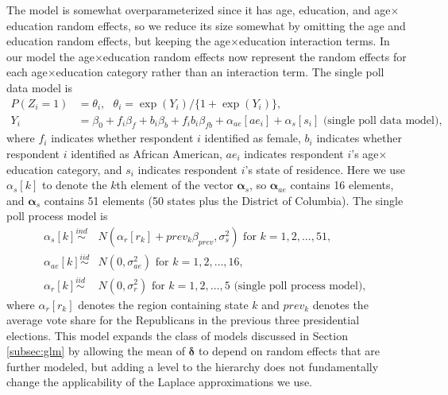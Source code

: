 \documentclass[12pt]{article}
\begin{document}
The model is somewhat overparameterized since it has age, education, and age$\times$education random effects, so we reduce its size somewhat by omitting the age and education random effects, but keeping the age$\times$education interaction terms. In our model the age$\times$education random effects now represent the random effects for each age$\times$education category rather than an interaction term. The single poll data model is
\begin{align*}
P(Z_i = 1) &= \theta_i,\ \ \   \theta_i = \exp(Y_i)/\{1 + \exp(Y_i)\}, \\
Y_i &= \beta_0 + f_i\beta_f + b_i\beta_b + f_ib_i\beta_{fb} + \alpha_{ae}[ae_i] + \alpha_{s}[s_i]\mbox{\ \ \ \ (single poll data model), }
\end{align*}
where $f_i$ indicates whether respondent $i$ identified as female, $b_i$ indicates whether respondent $i$ identified as African American, $ae_i$ indicates respondent $i$'s age$\times$education category, and $s_i$ indicates respondent $i$'s state of residence. Here we use $\alpha_{s}[k]$ to denote the $k$th element of the vector $\bm{\alpha}_s$, so $\bm{\alpha}_{ae}$ contains 16 elements, and $\bm{\alpha}_s$ contains 51 elements (50 states plus the District of Columbia). The single poll process model is
\begin{align*}
\alpha_s[k] \stackrel{ind}{\sim}& N(\alpha_r[r_k] + prev_k\beta_{prev}, \sigma^2_s) \mbox{ for } k=1,2,\dots,51,\\
\alpha_{ae}[k] \stackrel{iid}{\sim}& N(0, \sigma^2_{ae}) \mbox{ for } k=1,2,\dots,16,\\
\alpha_{r}[k] \stackrel{iid}{\sim}& N(0, \sigma^2_{r}) \mbox{ for } k=1,2,\dots,5 \mbox{\ \ \ \ (single poll process model), }
\end{align*}
where $\alpha_r[r_k]$ denotes the region containing state $k$ and $prev_k$ denotes the average vote share for the Republicans in the previous three presidential elections. This model expands the class of models discussed in Section \ref{subsec:glm} by allowing the mean of $\bm{\delta}$ to depend on random effects that are further modeled, but adding a level to the hierarchy does not fundamentally change the applicability of the Laplace approximations we use.
\end{document}
